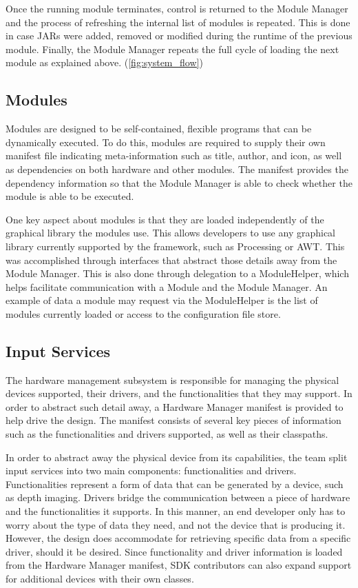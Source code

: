 \documentclass[11pt,letterpaper]{article}
\begin{document}
	Once the running module terminates, control is returned to the Module Manager
	and the process of refreshing the internal list of modules is repeated. This
	is done in case JARs were added, removed or modified during the runtime of the
	previous module. Finally, the Module Manager repeats the full cycle of loading
	the next module as explained above.
	(\autoref{fig:system_flow})

	\subsection{Modules}

	Modules are designed to be self-contained, flexible programs that can be 
	dynamically executed. To do this, modules are required to supply their own 
	manifest file indicating meta-information such as title, author, and icon, 
	as well as dependencies on both hardware and other modules. The manifest 
	provides the dependency information so that the Module Manager is able to 
	check whether the module is able to be executed.

	One key aspect about modules is that they are loaded independently of the 
	graphical library the modules use. This allows developers to use any 
	graphical library currently supported by the framework, such as Processing 
	or AWT.  This was accomplished through interfaces that abstract those 
	details away from the Module Manager.  This is also done through 
	delegation to a ModuleHelper, which helps facilitate communication with a 
	Module and the Module Manager. An example of data a module may request via 
	the ModuleHelper is the list of modules currently loaded or access to the 
	configuration file store.

	\subsection{Input Services}

	The hardware management subsystem is responsible for managing the physical 
	devices supported, their drivers, and the functionalities that they may 
	support. In order to abstract such detail away, a Hardware Manager 
	manifest is provided to help drive the design. The manifest consists of 
	several key pieces of information such as the functionalities and drivers 
	supported, as well as their classpaths.

	In order to abstract away the physical device from its capabilities, the 
	team split input services into two main components: functionalities and 
	drivers. Functionalities represent a form of data that can be generated by 
	a device, such as depth imaging. Drivers bridge the communication between 
	a piece of hardware and the functionalities it supports. In this manner, 
	an end developer only has to worry about the type of data they need, and 
	not the device that is producing it. However, the design does accommodate 
	for retrieving specific data from a specific driver, should it be desired. 
	Since functionality and driver information is loaded from the Hardware 
	Manager manifest, SDK contributors can also expand support for additional 
	devices with their own classes.
\end{document}

